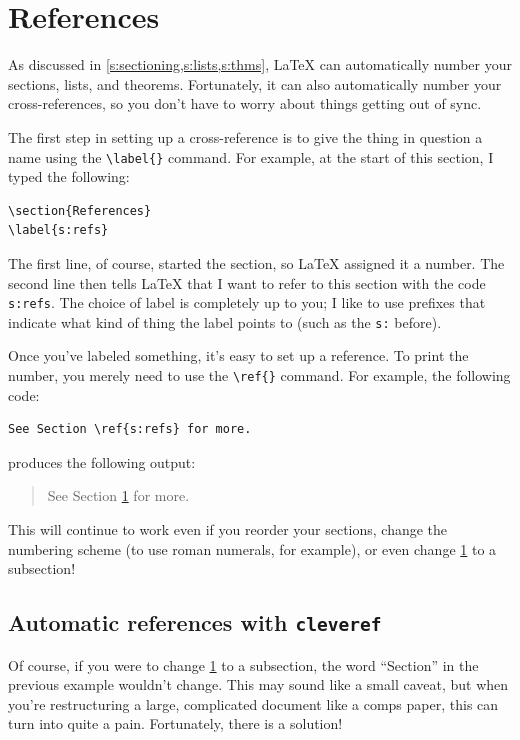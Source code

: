 \documentclass{article}
\newcommand*{\code}[1]{\texttt{#1}}
\begin{document}
\section{References}
\label{s:refs}
As discussed in \cref{s:sectioning,s:lists,s:thms}, \LaTeX{} can automatically number your sections, lists, and theorems.
Fortunately, it can also automatically number your cross-references, so you don't have to worry about things getting out of sync.

The first step in setting up a cross-reference is to give the thing in question a name using the \code{\textbackslash{}label\{\}} command.
For example, at the start of this section, I typed the following:
\begin{verbatim}
\section{References}
\label{s:refs}
\end{verbatim}
The first line, of course, started the section, so \LaTeX{} assigned it a number.
The second line then tells \LaTeX{} that I want to refer to this section with the code \code{s:refs}.
The choice of label is completely up to you; I like to use prefixes that indicate what kind of thing the label points to (such as the \code{s:} before).

Once you've labeled something, it's easy to set up a reference.
To print the number, you merely need to use the \code{\textbackslash{}ref\{\}} command.
For example, the following code:
\begin{verbatim}
See Section \ref{s:refs} for more.
\end{verbatim}
produces the following output:
\begin{quote}
  See Section \ref{s:refs} for more.
\end{quote}

This will continue to work even if you reorder your sections, change the numbering scheme (to use roman numerals, for example), or even change \cref{s:refs} to a subsection!

\subsection{Automatic references with \code{cleveref}}
\label{s:cleveref}
Of course, if you were to change \cref{s:refs} to a subsection, the word \enquote{Section} in the previous example wouldn't change.
This may sound like a small caveat, but when you're restructuring a large, complicated document like a comps paper, this can turn into quite a pain.
Fortunately, there is a solution!
\end{document}
